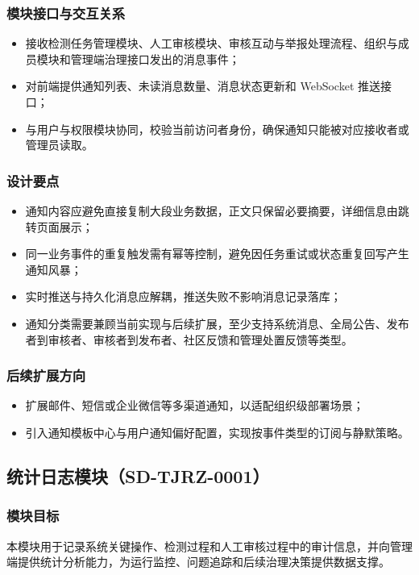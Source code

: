 \subsubsection{模块接口与交互关系}
\begin{itemize}[leftmargin=2em]
    \item 接收检测任务管理模块、人工审核模块、审核互动与举报处理流程、组织与成员模块和管理端治理接口发出的消息事件；
    \item 对前端提供通知列表、未读消息数量、消息状态更新和 WebSocket 推送接口；
    \item 与用户与权限模块协同，校验当前访问者身份，确保通知只能被对应接收者或管理员读取。
\end{itemize}

\subsubsection{设计要点}
\begin{itemize}[leftmargin=2em]
    \item 通知内容应避免直接复制大段业务数据，正文只保留必要摘要，详细信息由跳转页面展示；
    \item 同一业务事件的重复触发需有幂等控制，避免因任务重试或状态重复回写产生通知风暴；
    \item 实时推送与持久化消息应解耦，推送失败不影响消息记录落库；
    \item 通知分类需要兼顾当前实现与后续扩展，至少支持系统消息、全局公告、发布者到审核者、审核者到发布者、社区反馈和管理处置反馈等类型。
\end{itemize}

\subsubsection{后续扩展方向}
\begin{itemize}[leftmargin=2em]
    \item 扩展邮件、短信或企业微信等多渠道通知，以适配组织级部署场景；
    \item 引入通知模板中心与用户通知偏好配置，实现按事件类型的订阅与静默策略。
\end{itemize}

\subsection{统计日志模块（SD-TJRZ-0001）}

\subsubsection{模块目标}
本模块用于记录系统关键操作、检测过程和人工审核过程中的审计信息，并向管理端提供统计分析能力，为运行监控、问题追踪和后续治理决策提供数据支撑。

